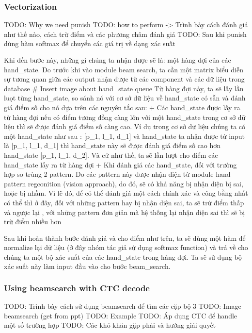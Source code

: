     \subsubsection{ Vectorization }
      TODO: Why we need punish
      TODO: how to perform -> Trình bày cách đánh giá như thế nào, cách trừ điểm và các phương châm đánh giá
      TODO: Sau khi punish dùng hàm softmax để chuyển các giá trị về dạng xác suất

      Khi đến bước này, những gì chúng ta nhận được sẽ là: một hàng đợi của các hand_state.
      Do trước khi vào module beam search, ta cần một matrix biểu diễn sự tương quan giữa các output nhận được từ các component và các dữ liệu trong database
      # Insert image about hand_state queue
      Từ hàng đợi này, ta sẽ lấy lần luọt từng hand_state, so sánh nó với cơ sở dữ liệu về hand_state có sẵn 
      và đánh giá điểm số cho nó dựa trên các nguyên tắc sau:
        + Các hand_state được lấy ra từ hàng đợi nếu có điểm tương đồng càng lớn với một hand_state
        trong cơ sở dữ liệu thì sẽ được đánh giá điểm số càng cao. Ví dụ trong cơ sở dữ liệu chúng ta
        có một hand_state như sau : [p_1, l_1, d_1] và hand_state ta nhận được từ input là [p_1, l_1, d_1] thì hand_state này sẽ
        được đánh giá điểm số cao hơn hand_state [p_1, l_1, d_2]. Và cứ như thế, ta sẽ lần lượt cho điểm các hand_state lấy ra từ hàng đợi
        + Khi đánh giá các hand_state, đối với trường hợp so trùng 2 pattern. Do các pattern này được nhận diện từ module
        hand pattern regconition (vision approach), do đó, sẽ có khả năng bị nhận diện bị sai, hoặc bị nhầm. Vì lẽ đó, để có thể
        đánh giá một cách chính xác và công bằng nhất có thể thì ở đây, đối với những pattern hay bị nhận diện sai, ta sẽ trừ điểm thấp và ngược lại
        , với những pattern đơn giản mà hệ thống lại nhận diện sai thì sẽ bị trừ điểm nhiều hơn
      
      Sau khi hoàn thành bước đánh giá và cho điểm như trên, ta sẽ dùng một hàm để normalize
      lại dữ liệu (ở đây nhóm tác giả sử dụng softmax function) và trả về cho chúng ta một bộ xác suất của các hand_state trong hàng đợi. Ta sẽ sử dụng bộ xác suất này
      làm input đầu vào cho bước beam_search.
    \subsubsection{ Using beamsearch with CTC decode }
      TODO: Trình bày cách sử dụng beamsearch để tìm các cặp bộ 3
      TODO: Image beamsearch (get from ppt)
      TODO: Example
      TODO: Áp dụng CTC để handle một số trường hợp
      TODO: Các khó khăn gặp phải và hướng giải quyết
      
